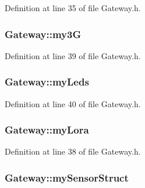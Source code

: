 Definition at line 35 of file Gateway.\+h.

\subsubsection[{\texorpdfstring{my3G}{my3G}}]{ Gateway\+::my3G\hspace{0.3cm}{\ttfamily [private]}}\hypertarget{class_gateway_a1a8fea5745d4519cfeb681135372dcb3}{}\label{class_gateway_a1a8fea5745d4519cfeb681135372dcb3}


Definition at line 39 of file Gateway.\+h.

\subsubsection[{\texorpdfstring{my\+Leds}{myLeds}}]{ Gateway\+::my\+Leds\hspace{0.3cm}{\ttfamily [private]}}\hypertarget{class_gateway_adda10328b9e799d16a456008ca50caa8}{}\label{class_gateway_adda10328b9e799d16a456008ca50caa8}


Definition at line 40 of file Gateway.\+h.

\subsubsection[{\texorpdfstring{my\+Lora}{myLora}}]{ Gateway\+::my\+Lora\hspace{0.3cm}{\ttfamily [private]}}\hypertarget{class_gateway_a3665047d9fe3f4beb5fbb172a33873a3}{}\label{class_gateway_a3665047d9fe3f4beb5fbb172a33873a3}


Definition at line 38 of file Gateway.\+h.

\subsubsection[{\texorpdfstring{my\+Sensor\+Struct}{mySensorStruct}}]{ Gateway\+::my\+Sensor\+Struct\hspace{0.3cm}{\ttfamily [private]}}\hypertarget{class_gateway_a270aad0f50decd3f5140f4e1cdab5c52}{}\label{class_gateway_a270aad0f50decd3f5140f4e1cdab5c52}


